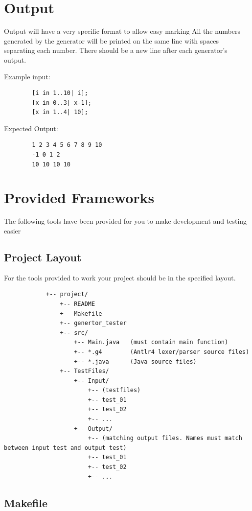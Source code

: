 \documentclass{article}
\begin{document}
\section{Output}
	
	Output will have a very specific format to allow easy marking All the numbers generated by the generator will be
	printed on the same line with spaces separating each number. There should be a new line after each generator's
	output. 
	
	Example input:
	
	\begin{lstlisting}
		[i in 1..10| i];
		[x in 0..3| x-1];
		[x in 1..4| 10];
	\end{lstlisting}
	
	Expected Output:
	
	\begin{lstlisting}
		1 2 3 4 5 6 7 8 9 10
		-1 0 1 2
		10 10 10 10
	\end{lstlisting}


\section{Provided Frameworks}

	The following tools have been provided for you to make development and testing easier 

	\subsection{Project Layout}
	
		For the tools provided to work your project should be in the specified layout.
		
		\begin{lstlisting}
			+-- project/
				+-- README
				+-- Makefile
				+-- genertor_tester
				+-- src/
					+-- Main.java	(must contain main function)
					+-- *.g4		(Antlr4 lexer/parser source files)
					+-- *.java		(Java source files)
				+-- TestFiles/
					+-- Input/
						+-- (testfiles)
						+-- test_01
						+-- test_02
						+-- ...
					+-- Output/
						+-- (matching output files. Names must match between input test and output test)
						+-- test_01
						+-- test_02
						+-- ...
		\end{lstlisting}


	\subsection{Makefile}
	
\end{document}
